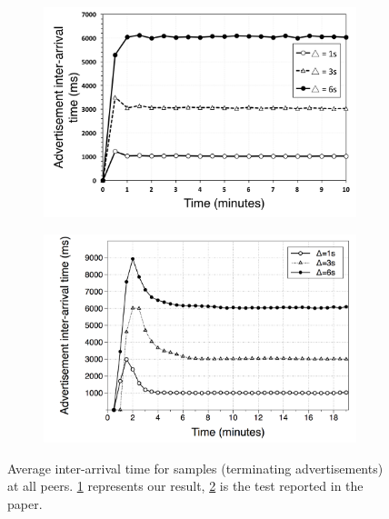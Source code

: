 \begin{figure}
\centering
\begin{subfigure}{.5\textwidth}
  \centering
  \includegraphics[keepaspectratio=true, width=1\linewidth]{images/average_interarrivaltime}
  \caption{}
  \label{fig:average_interarrivaltime}
\end{subfigure}%
\begin{subfigure}{.5\textwidth}
  \centering
  \includegraphics[keepaspectratio=true, width=1\linewidth]{images/paper_average_interarrivaltime}
  \caption{}
  \label{fig:paper_average_interarrivaltime}
\end{subfigure}
\caption{Average inter-arrival time for samples (terminating advertisements) at all peers. \ref{fig:average_interarrivaltime} represents our result, \ref{fig:paper_average_interarrivaltime} is the test reported in the paper.}
\label{fig:ad_average_interarrivaltime}
\end{figure}

